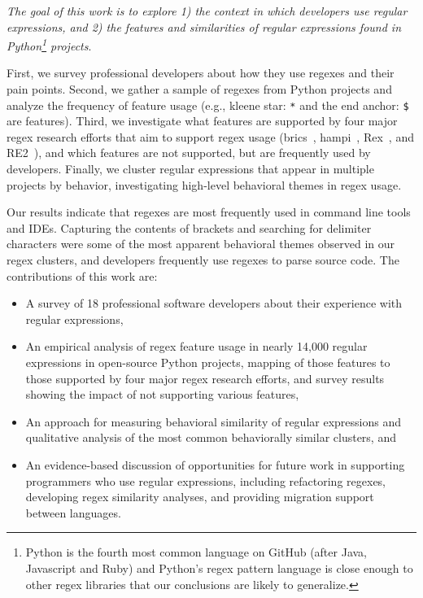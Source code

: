 \emph{The goal of this work is to explore 1) the context in which developers use regular expressions, and 2) the features and similarities of  regular expressions found in Python\footnote{Python is the fourth most common language on GitHub (after Java, Javascript and Ruby) and  Python's regex pattern language is close enough to other regex libraries that our conclusions are likely to generalize.} projects}.

First, we survey professional developers about how they use regexes and their pain points.  Second, we gather a sample of regexes from Python projects and analyze the frequency of feature usage (e.g., kleene star: \verb!*! and the end anchor: \verb!$! are features).    Third, we investigate what features are supported by four major regex research efforts that aim to support regex usage (brics~\cite{brics}, hampi~\cite{hampi}, Rex~\cite{rex}, and RE2~\cite{re2}), and which features are not supported, but are frequently used by developers.  Finally, we cluster regular expressions that appear in multiple projects by behavior, investigating high-level behavioral themes in regex usage.

Our results indicate that regexes are most frequently used in command line tools and IDEs.    Capturing the contents of brackets and searching for delimiter characters were some of the most apparent  behavioral themes observed in our regex clusters, and developers frequently use regexes to parse source code.
The contributions of this work are:
\begin{itemize} \setlength \itemsep{.1pt}
    \item A survey of 18 professional software developers about their experience with regular expressions,
	\item An empirical analysis of regex feature usage in nearly 14,000 regular expressions in  open-source Python projects, mapping of those features to those supported by four major regex research efforts, and survey results showing the impact of not supporting various features,
	\item An approach for measuring behavioral similarity of regular expressions and qualitative analysis of the most common behaviorally similar clusters, and
	\item An evidence-based discussion of opportunities for future work in supporting programmers who use regular expressions, including refactoring regexes, developing regex similarity analyses, and providing migration support between languages.
\end{itemize}
